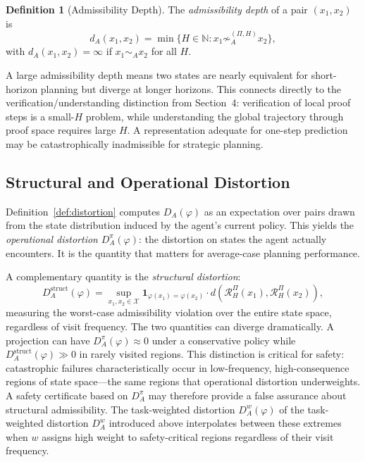 \documentclass[11pt, a4paper]{article}
\theoremstyle{plain}
\theoremstyle{definition}
\newtheorem{definition}{Definition}
\theoremstyle{remark}
\newcommand{\simA}{\sim_A}
\newcommand{\RHP}{\mathcal{R}_H^\Pi}
\newcommand{\DA}{D_A(\varphi)}
\begin{document}
\begin{definition}[Admissibility Depth]
\label{def:depth}
The \emph{admissibility depth} of a pair $(x_1, x_2)$ is
\begin{equation}
  d_A(x_1, x_2)
  = \min\bigl\{H \in \mathbb{N}
    : x_1 \not\sim_A^{(\Pi,H)} x_2\bigr\},
\end{equation}
with $d_A(x_1, x_2) = \infty$ if $x_1 \simA x_2$ for all $H$.
\end{definition}

A large admissibility depth means two states are nearly equivalent for
short-horizon planning but diverge at longer horizons. This connects directly
to the verification/understanding distinction from Section~4: verification of
local proof steps is a small-$H$ problem, while understanding the global
trajectory through proof space requires large $H$. A representation adequate
for one-step prediction may be catastrophically inadmissible for strategic
planning.

\subsection{Structural and Operational Distortion}

Definition~\ref{def:distortion} computes $\DA$ as an expectation over pairs
drawn from the state distribution induced by the agent's current policy. This
yields the \emph{operational distortion} $D_A^\pi(\varphi)$: the distortion
on states the agent actually encounters. It is the quantity that matters for
average-case planning performance.

A complementary quantity is the \emph{structural distortion}:
\begin{equation}
  D_A^{\text{struct}}(\varphi)
  = \sup_{x_1, x_2 \in \mathcal{X}}
    \mathbf{1}_{\varphi(x_1)=\varphi(x_2)}
    \cdot d\!\left(\RHP(x_1), \RHP(x_2)\right),
\end{equation}
measuring the worst-case admissibility violation over the entire state space,
regardless of visit frequency. The two quantities can diverge dramatically.
A projection can have $D_A^\pi(\varphi) \approx 0$ under a conservative policy
while $D_A^{\text{struct}}(\varphi) \gg 0$ in rarely visited regions. This
distinction is critical for safety: catastrophic failures characteristically
occur in low-frequency, high-consequence regions of state space---the same
regions that operational distortion underweights. A safety certificate based
on $D_A^\pi$ may therefore provide a false assurance about structural
admissibility. The task-weighted distortion $D_A^w(\varphi)$ of
the task-weighted distortion $D_A^w$ introduced above interpolates between these extremes when $w$ assigns high weight
to safety-critical regions regardless of their visit frequency.
\end{document}
